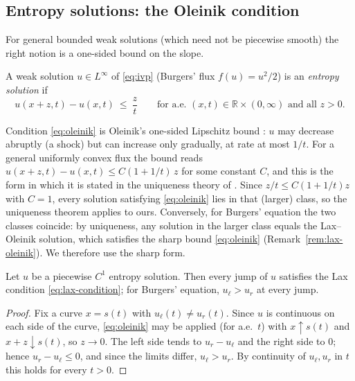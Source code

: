 \subsection{Entropy solutions: the Oleinik condition}
\label{subsec:oleinik}

For general bounded weak solutions (which need not be piecewise smooth)
the right notion is a one-sided bound on the slope.

\begin{definition}
\label{def:entropy-solution}
A weak solution $u\in L^\infty$ of \eqref{eq:ivp} (Burgers' flux
$f(u)=u^2/2$) is an \emph{entropy solution} if
\begin{equation}
  \label{eq:oleinik}
  u(x+z,t)-u(x,t)\ \le\ \frac{z}{t}
  \qquad\text{for a.e.\ }(x,t)\in\mathbb{R}\times(0,\infty)\text{ and all }z>0 .
\end{equation}
\end{definition}

\noindent Condition \eqref{eq:oleinik} is Oleinik's one-sided Lipschitz
bound \cite{oleinik1957}: $u$ may decrease abruptly (a shock) but can increase only
gradually, at rate at most $1/t$. For a general uniformly convex flux the
bound reads $u(x+z,t)-u(x,t)\le C(1+1/t)\,z$ for some constant $C$, and
this is the form in which it is stated in the uniqueness theory of
\cite[\S3.4]{evans2010}. Since $z/t\le C(1+1/t)z$ with $C=1$, every
solution satisfying \eqref{eq:oleinik} lies in that (larger) class, so the
uniqueness theorem applies to ours. Conversely, for Burgers' equation the
two classes coincide: by uniqueness, any solution in the larger class equals
the Lax--Oleinik solution, which satisfies the sharp bound
\eqref{eq:oleinik} (Remark~\ref{rem:lax-oleinik}). We therefore use the
sharp form.
\begin{lemma}
\label{lem:oleinik-lax}
Let $u$ be a piecewise $C^1$ entropy solution. Then every jump of $u$
satisfies the Lax condition \eqref{eq:lax-condition}; for Burgers'
equation, $u_\ell>u_r$ at every jump.
\end{lemma}

\begin{proof}
Fix a curve $x=s(t)$ with $u_\ell(t)\ne u_r(t)$. Since $u$ is continuous
on each side of the curve, \eqref{eq:oleinik} may be applied (for a.e.\ $t$) with $x
\uparrow s(t)$ and $x+z\downarrow s(t)$, so $z\to0$. The left side tends
to $u_r-u_\ell$ and the right side to $0$; hence $u_r-u_\ell\le0$, and
since the limits differ, $u_\ell>u_r$. By continuity of
$u_\ell,u_r$ in $t$ this holds for every $t>0$.
\end{proof}

